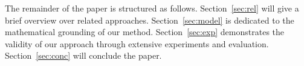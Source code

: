 The remainder of the paper is structured as follows. Section~\ref{sec:rel}
will give a brief overview over related approaches. Section~\ref{sec:model} is
dedicated to the mathematical grounding of our method.
Section~\ref{sec:exp} demonstrates the validity of our approach through
extensive experiments and evaluation. Section~\ref{sec:conc} will conclude the
paper.
